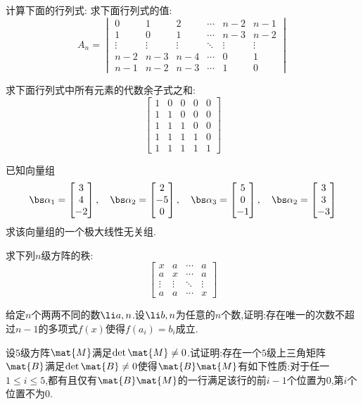 \documentclass{ctexart}
\begin{document}
\begin{homework}[3(15')]
    计算下面的行列式:
    求下面行列式的值:
    \[A_n=\begin{vmatrix}
        0&1&2&\cdots&n-2&n-1\\
        1&0&1&\cdots&n-3&n-2\\
        \vdots&\vdots&\vdots&\ddots&\vdots&\vdots\\
        n-2&n-3&n-4&\cdots&0&1\\
        n-1&n-2&n-3&\cdots&1&0
    \end{vmatrix}\]
\end{homework}
\begin{homework}[4(13')]
    求下面行列式中所有元素的代数余子式之和:
    \[\begin{bmatrix}
        1&0&0&0&0\\
        1&1&0&0&0\\
        1&1&1&0&0\\
        1&1&1&1&0\\
        1&1&1&1&1
    \end{bmatrix}\]
\end{homework}
\begin{homework}[5(10')]
    已知向量组
    \[\bs\alpha_1=\begin{bmatrix}
        3\\4\\-2
    \end{bmatrix},\quad\bs\alpha_2=\begin{bmatrix}
        2\\-5\\0
    \end{bmatrix},\quad\bs\alpha_3=\begin{bmatrix}
        5\\0\\-1
    \end{bmatrix},\quad\bs\alpha_2=\begin{bmatrix}
        3\\3\\-3
    \end{bmatrix}\]
    求该向量组的一个极大线性无关组.
\end{homework}
\begin{homework}[6(12')]
    求下列$n$级方阵的秩:
    \[\begin{bmatrix}
        x&a&\cdots&a\\
        a&x&\cdots&a\\
        \vdots&\vdots&\ddots&\vdots\\
        a&a&\cdots&x
    \end{bmatrix}\]
\end{homework}
\begin{homework}[7(10')]
    给定$n$个两两不同的数$\li a,n$.设$\li b,n$为任意的$n$个数,证明:存在唯一的次数不超过$n-1$的多项式$f(x)$使得$f\left(a_i\right)=b_i$成立.
\end{homework}
\begin{homework}[8(10')]
    设$5$级方阵$\mat{M}$满足$\det\mat{M}\neq0$.试证明:存在一个$5$级上三角矩阵$\mat{B}$满足$\det\mat{B}\neq0$使得$\mat{B}\mat{M}$有如下性质:对于任一$1\leqslant i\leqslant 5$,都有且仅有$\mat{B}\mat{M}$的一行满足该行的前$i-1$个位置为$0$,第$i$个位置不为$0$.
\end{homework}
\end{document}
